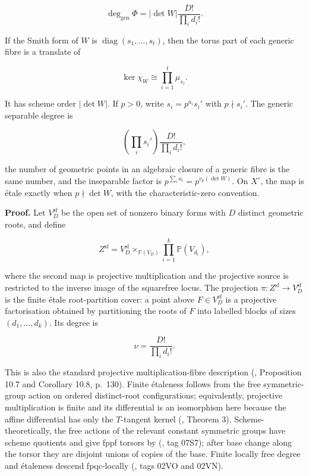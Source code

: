 \documentclass[
  11pt,
  a4paper,
]{article}
\begin{document}
\[
 \boxed{
 \deg_{\mathrm{gen}}\Phi
 =|\det W|\frac{D!}{\prod_i d_i!}.
 }
\]

If the Smith form of \(W\) is \(\operatorname{diag}(s_1,\ldots,s_t)\),
then the torus part of each generic fibre is a translate of

\[
 \ker\chi_W\cong\prod_{i=1}^t\mu_{s_i}.
\]

It has scheme order \(|\det W|\). If \(p>0\), write \(s_i=p^{a_i}s_i'\)
with \(p\nmid s_i'\). The generic separable degree is

\[
 \left(\prod_i s_i'\right)\frac{D!}{\prod_i d_i!},
\]

the number of geometric points in an algebraic closure of a generic
fibre is the same number, and the inseparable factor is
\(p^{\sum_i a_i}=p^{v_p(\det W)}\). On \(X^\circ\), the map is étale
exactly when \(p\nmid\det W\), with the characteristic-zero convention.

\textbf{Proof.} Let \(V_D^{\mathrm{sf}}\) be the open set of nonzero
binary forms with \(D\) distinct geometric roots, and define

\[
 Z^{\mathrm{sf}}
 =V_D^{\mathrm{sf}}\mathop{\times}_{\mathbb P(V_D)}
   \prod_{i=1}^k\mathbb P(V_{d_i}),
\]

where the second map is projective multiplication and the projective
source is restricted to the inverse image of the squarefree locus. The
projection \(\pi:Z^{\mathrm{sf}}\to V_D^{\mathrm{sf}}\) is the finite
étale root-partition cover: a point above \(F\in V_D^{\mathrm{sf}}\) is
a projective factorisation obtained by partitioning the roots of \(F\)
into labelled blocks of sizes \((d_1,\ldots,d_k)\). Its degree is

\[
 \nu=\frac{D!}{\prod_i d_i!}.
\tag{8.1}
\]

This is also the standard projective multiplication-fibre description
(, Proposition 10.7 and Corollary 10.8, p.~130). Finite étaleness
follows from the free symmetric-group action on ordered distinct-root
configurations; equivalently, projective multiplication is finite and
its differential is an isomorphism here because the affine differential
has only the \(T\)-tangent kernel
(, Theorem 3). Scheme-theoretically, the free actions of the
relevant constant symmetric groups have scheme quotients and give fppf
torsors by (, tag 07S7); after base change along the torsor they are disjoint
unions of copies of the base. Finite locally free degree and étaleness
descend fpqc-locally (, tags 02VO and 02VN).
\end{document}
